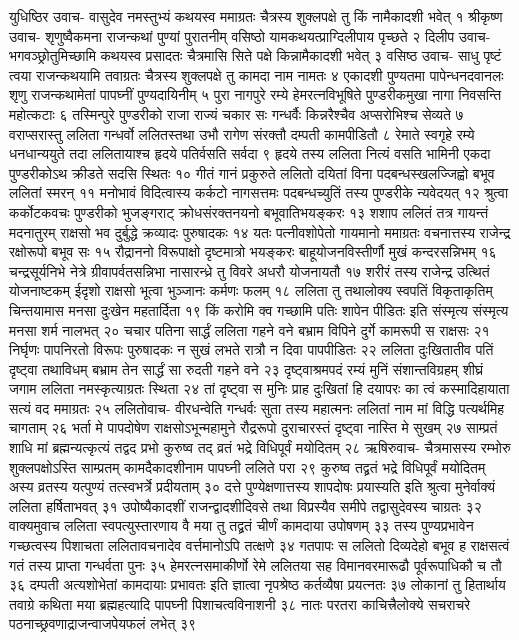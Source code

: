 युधिष्ठिर उवाच-
वासुदेव नमस्तुभ्यं कथयस्व ममाग्रतः 
चैत्रस्य शुक्लपक्षे तु किं नामैकादशी भवेत् १
श्रीकृष्ण उवाच-
शृणुष्वैकमना राजन्कथां पुण्यां पुरातनीम् 
वसिष्ठो यामकथयत्प्राग्दिलीपाय पृच्छते २
दिलीप उवाच-
भगवञ्छ्रोतुमिच्छामि कथयस्व प्रसादतः 
चैत्रमासि सिते पक्षे किन्नामैकादशी भवेत् ३
वसिष्ठ उवाच-
साधु पृष्टं त्वया राजन्कथयामि तवाग्रतः 
चैत्रस्य शुक्लपक्षे तु कामदा नाम नामतः ४
एकादशी पुण्यतमा पापेन्धनदवानलः 
शृणु राजन्कथामेतां पापघ्नीं पुण्यदायिनीम् ५
पुरा नागपुरे रम्ये हेमरत्नविभूषिते 
पुण्डरीकमुखा नागा निवसन्ति महोत्कटाः ६
तस्मिन्पुरे पुण्डरीको राजा राज्यं चकार सः 
गन्धर्वैः किन्नरैश्चैव अप्सरोभिश्च सेव्यते ७
वराप्सरास्तु ललिता गन्धर्वो ललितस्तथा 
उभौ रागेण संरक्तौ दम्पती कामपीडितौ ८
रेमाते स्वगृहे रम्ये धनधान्ययुते तदा 
ललितायाश्च हृदये पतिर्वसति सर्वदा ९
हृदये तस्य ललिता नित्यं वसति भामिनी 
एकदा पुण्डरीकोऽथ क्रीडते सदसि स्थितः १०
गीतं गानं प्रकुरुते ललितो दयितां विना 
पदबन्धस्खलज्जिह्वो बभूव ललितां स्मरन् ११
मनोभावं विदित्वास्य कर्कटो नागसत्तमः 
पदबन्धच्युतिं तस्य पुण्डरीके न्यवेदयत् १२
श्रुत्वा कर्कोटकवचः पुण्डरीको भुजङ्गराट् 
क्रोधसंरक्तनयनो बभूवातिभयङ्करः १३
शशाप ललितं तत्र गायन्तं मदनातुरम् 
राक्षसो भव दुर्बुद्धे क्रव्यादः पुरुषादकः १४
यतः पत्नीवशोपेतो गायमानो ममाग्रतः 
वचनात्तस्य राजेन्द्र रक्षोरूपो बभूव सः १५
रौद्राननो विरूपाक्षो दृष्टमात्रो भयङ्करः 
बाहूयोजनविस्तीर्णौ मुखं कन्दरसन्निभम् १६
चन्द्रसूर्यनिभे नेत्रे ग्रीवापर्वतसन्निभा 
नासारन्ध्रे तु विवरे अधरौ योजनायतौ १७
शरीरं तस्य राजेन्द्र उत्थितं योजनाष्टकम् 
ईदृशो राक्षसो भूत्वा भुञ्जानः कर्मणः फलम् १८
ललिता तु तथालोक्य स्वपतिं विकृताकृतिम् 
चिन्तयामास मनसा दुःखेन महतार्दिता १९
किं करोमि क्व गच्छामि पतिः शापेन पीडितः 
इति संस्मृत्य संस्मृत्य मनसा शर्म नालभत् २०
चचार पतिना सार्द्धं ललिता गहने वने 
बभ्राम विपिने दुर्गे कामरूपी स राक्षसः २१
निर्घृणः पापनिरतो विरूपः पुरुषादकः 
न सुखं लभते रात्रौ न दिवा पापपीडितः २२
ललिता दुःखितातीव पतिं दृष्ट्वा तथाविधम् 
बभ्राम तेन सार्द्धं सा रुदती गहने वने २३
दृष्ट्वाश्रमपदं रम्यं मुनिं संशान्तविग्रहम् 
शीघ्रं जगाम ललिता नमस्कृत्याग्रतः स्थिता २४
तां दृष्ट्वा स मुनिः प्राह दुःखितां हि दयापरः 
का त्वं कस्मादिहायाता सत्यं वद ममाग्रतः २५
ललितोवाच-
वीरधन्वेति गन्धर्वः सुता तस्य महात्मनः 
ललितां नाम मां विद्धि पत्यर्थमिह चागताम् २६
भर्ता मे पापदोषेण राक्षसोऽभून्महामुने 
रौद्ररूपो दुराचारस्तं दृष्ट्वा नास्ति मे सुखम् २७
साम्प्रतं शाधि मां ब्रह्मन्यत्कृत्यं तद्वद प्रभो 
कुरुष्व तद् व्रतं भद्रे विधिपूर्वं मयोदितम् २८
ऋषिरुवाच-
चैत्रमासस्य रम्भोरु शुक्लपक्षोऽस्ति साम्प्रतम् 
कामदैकादशीनाम पापघ्नी ललिते परा २९
कुरुष्व तद्व्रतं भद्रे विधिपूर्वं मयोदितम् 
अस्य व्रतस्य यत्पुण्यं तत्स्वभर्त्रे प्रदीयताम् ३०
दत्ते पुण्येक्षणात्तस्य शापदोषः प्रयास्यति 
इति श्रुत्वा मुनेर्वाक्यं ललिता हर्षिताभवत् ३१
उपोष्यैकादशीं राजन्द्वादशीदिवसे तथा 
विप्रस्यैव समीपे तद्वासुदेवस्य चाग्रतः ३२
वाक्यमुवाच ललिता स्वपत्युस्तारणाय वै 
मया तु तद्व्रतं चीर्णं कामदाया उपोषणम् ३३
तस्य पुण्यप्रभावेन गच्छत्वस्य पिशाचता 
ललितावचनादेव वर्त्तमानोऽपि तत्क्षणे ३४
गतपापः स ललितो दिव्यदेहो बभूव ह 
राक्षसत्वं गतं तस्य प्राप्ता गन्धर्वता पुनः ३५
हेमरत्नसमाकीर्णो रेमे ललितया सह 
विमानवरमारूढौ पूर्वरूपाधिकौ च तौ ३६
दम्पती अत्यशोभेतां कामदायाः प्रभावतः 
इति ज्ञात्वा नृपश्रेष्ठ कर्तव्यैषा प्रयत्नतः ३७
लोकानां तु हितार्थाय तवाग्रे कथिता मया 
ब्रह्महत्यादि पापघ्नी पिशाचत्वविनाशनी ३८
नातः परतरा काचित्त्रैलोक्ये सचराचरे 
पठनाच्छ्रवणाद्राजन्वाजपेयफलं लभेत् ३९

